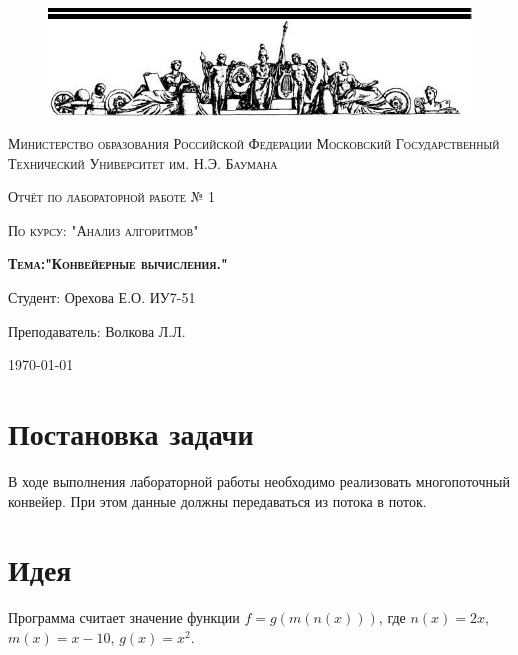 \documentclass[a4paper,12pt]{article}
\begin{document}
\begin{titlepage}
	\centering
    \begin{figure}[H]
    	\includegraphics[scale=1.2]{photo}
   	\end{figure}
	{\scshape Министерство образования Российской Федерации
Московский Государственный Технический Университет им. Н.Э. Баумана \par}
	\vspace{4cm}
	{\scshape\Large Отчёт по лабораторной работе № 1\par}
    {\scshape\Large По курсу: "Анализ алгоритмов"\par}
	{\scshape\Large\bf Тема:"Конвейерные вычисления."\par}
    \vspace{2cm}
    {\flushright Студент: Орехова Е.О. ИУ7-51\par
    \flushright Преподаватель: Волкова Л.Л.\par}
    \vspace{2cm}
	{\large \today\par}
\end{titlepage}

\def\contentaname{Содержание}
\tableofcontents %
\clearpage

\section{Постановка задачи}
    В ходе выполнения лабораторной работы необходимо реализовать многопоточный конвейер. При этом данные должны передаваться из потока в поток.

\section{Идея}
    Программа считает значение функции $f = g(m(n(x)))$, где $n(x) = 2x$, $m(x) = x-10$, $g(x) = x^2$.
	
    
\end{document}

